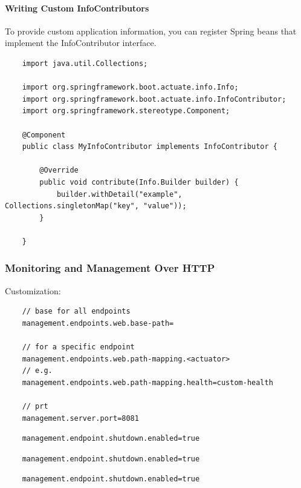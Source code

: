 \documentclass{scrartcl}
\begin{document}
\paragraph{Writing Custom InfoContributors}

    To provide custom application information, you can register Spring beans that implement the InfoContributor interface.

\begin{lstlisting}
    import java.util.Collections;

    import org.springframework.boot.actuate.info.Info;
    import org.springframework.boot.actuate.info.InfoContributor;
    import org.springframework.stereotype.Component;

    @Component
    public class MyInfoContributor implements InfoContributor {

        @Override
        public void contribute(Info.Builder builder) {
            builder.withDetail("example", Collections.singletonMap("key", "value"));
        }

    }
\end{lstlisting}



\subsubsection{Monitoring and Management Over HTTP}

Customization:

\begin{lstlisting}
    // base for all endpoints
    management.endpoints.web.base-path=

    // for a specific endpoint
    management.endpoints.web.path-mapping.<actuator>
    // e.g.
    management.endpoints.web.path-mapping.health=custom-health

    // prt
    management.server.port=8081
\end{lstlisting}

\begin{lstlisting}
    management.endpoint.shutdown.enabled=true
\end{lstlisting}
\begin{lstlisting}
    management.endpoint.shutdown.enabled=true
\end{lstlisting}
\begin{lstlisting}
    management.endpoint.shutdown.enabled=true
\end{lstlisting}
\end{document}
